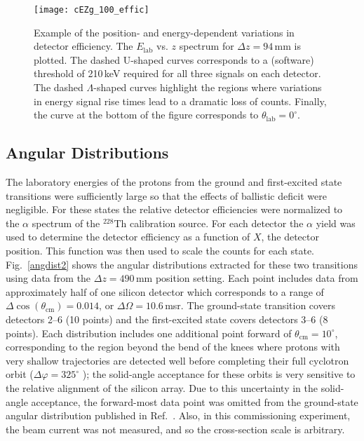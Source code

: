 \begin{figure}[th!]%
\texttt{[image: cEZg\_100\_effic]}%
\caption[Example of the position- and energy-dependent variations in detector efficiency]{Example of the position- and energy-dependent variations in detector efficiency.  The $E_\textrm{lab}$ vs. $z$ spectrum for $\Delta z = 94$\,mm is plotted.  The dashed U-\-shaped curves corresponds to a (software) threshold of 210\,keV required for all three signals on each detector. The dashed $\Lambda$-\-shaped curves highlight the regions where variations in energy signal rise times lead to a dramatic loss of counts.  Finally, the curve at the bottom of the figure corresponds to $\theta_\textrm{lab}=0^\circ$.}%
\label{cEZg_100}%
\end{figure}

\subsection{Angular Distributions}
The laboratory energies of the protons from the ground
and first-\-ex\-cit\-ed state transitions were sufficiently large so that the
effects of ballistic deficit were negligible.  For these states the relative detector
efficiencies were normalized to the $\alpha$ spectrum of the
$^{228}$Th calibration source. For each detector the $\alpha$ yield was used to determine the detector efficiency as a function of $X$, the detector position.  This function was then used to scale the counts for each state.  Fig.~\ref{angdist2} shows the angular distributions extracted for these two transitions using data from the
$\Delta z = 490$\,mm position setting. %
Each point includes data from approximately half of one silicon detector which corresponds to a range of $\Delta \cos(\theta_\mathrm{cm})=0.014$, or $\Delta \Omega=10.6$\,msr.  The ground-state transition covers detectors 2--6 (10 points) and the first-excited state covers detectors 3--6 (8 points).  Each distribution includes one additional point 
 forward of $\theta_\mathrm{cm}=10^\circ$, corresponding to the region beyond the bend of the knees where protons with
very shallow trajectories are detected well before completing their
full cyclotron orbit ($\Delta \varphi=325^\circ$%
); the solid-angle acceptance
for these orbits is very sensitive to the relative alignment of the
silicon array. Due to this uncertainty in the solid-angle acceptance, the forward-most data point was omitted from the ground-state angular distribution published in Ref.~\cite{Lighthall_2010}. 
 Also, in this
commissioning experiment, the beam current was not measured, and so
the cross-section scale is arbitrary.

